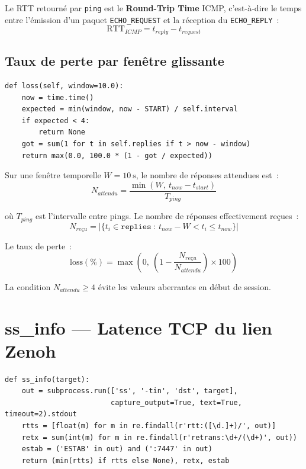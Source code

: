 \documentclass[a4paper,12pt]{article}
\begin{document}
Le RTT retourné par \texttt{ping} est le \textbf{Round-Trip Time} ICMP, c'est-à-dire le
temps entre l'émission d'un paquet \texttt{ECHO\_REQUEST} et la réception du
\texttt{ECHO\_REPLY}~:
\begin{equation}
  \text{RTT}_{ICMP} = t_{reply} - t_{request}
\end{equation}

\subsection{Taux de perte par fenêtre glissante}

\begin{lstlisting}
def loss(self, window=10.0):
    now = time.time()
    expected = min(window, now - START) / self.interval
    if expected < 4:
        return None
    got = sum(1 for t in self.replies if t > now - window)
    return max(0.0, 100.0 * (1 - got / expected))
\end{lstlisting}

Sur une fenêtre temporelle $W = 10\ \text{s}$, le nombre de réponses attendues est~:
\begin{equation}
  N_{attendu} = \frac{\min(W,\ t_{now} - t_{start})}{T_{ping}}
\end{equation}

où $T_{ping}$ est l'intervalle entre pings. Le nombre de réponses effectivement reçues~:
\begin{equation}
  N_{reçu} = \bigl|\{t_i \in \texttt{replies}\ :\ t_{now} - W < t_i \leq t_{now}\}\bigr|
\end{equation}

Le taux de perte~:
\begin{equation}
  \boxed{\text{loss}(\%) = \max\!\left(0,\ \left(1 - \frac{N_{reçu}}{N_{attendu}}\right) \times 100\right)}
\end{equation}

La condition $N_{attendu} \geq 4$ évite les valeurs aberrantes en début de session.

\section{ss\_info — Latence TCP du lien Zenoh}

\begin{lstlisting}[caption={Extraction du RTT TCP kernel}]
def ss_info(target):
    out = subprocess.run(['ss', '-tin', 'dst', target],
                         capture_output=True, text=True, timeout=2).stdout
    rtts = [float(m) for m in re.findall(r'rtt:([\d.]+)/', out)]
    retx = sum(int(m) for m in re.findall(r'retrans:\d+/(\d+)', out))
    estab = ('ESTAB' in out) and (':7447' in out)
    return (min(rtts) if rtts else None), retx, estab
\end{lstlisting}
\end{document}

